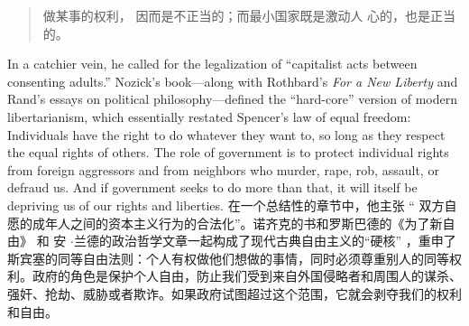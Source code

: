 \begin{paracol}{2}
\begin{quote}
做某事的权利， 因而是不正当的；而最小国家既是激动人
心的，也是正当的。
\end{quote}
\switchcolumn*
In a catchier vein, he called for the legalization of ``capitalist
acts between consenting adults.'' Nozick's book---along
with Rothbard's \textit{For a New Liberty} and Rand's essays on political
philosophy---defined the ``hard-core'' version of modern libertarianism, which essentially restated Spencer's law of equal freedom: Individuals have the right to do whatever they want to, so
long as they respect the equal rights of others. The role of government is to protect individual rights from foreign aggressors and from neighbors who murder, rape, rob, assault, or defraud
us. And if government seeks to do more than that, it will itself
be depriving us of our rights and liberties.
\switchcolumn
在一个总结性的章节中，他主张 “ 双方自愿的成年人之间的资本主义行为的合法化”。诺齐克的书和罗斯巴德的《为了新自由》 和 安 $\cdot$兰德的政治哲学文章一起构成了现代古典自由主义的“硬核” ，重申了斯宾塞的同等自由法则：个人有权做他们想做的事情，同时必须尊重别人的同等权利。政府的角色是保护个人自由，防止我们受到来自外国侵略者和周围人的谋杀、强奸、抢劫、威胁或者欺诈。如果政府试图超过这个范围，它就会剥夺我们的权利和自由。


\end{paracol}
